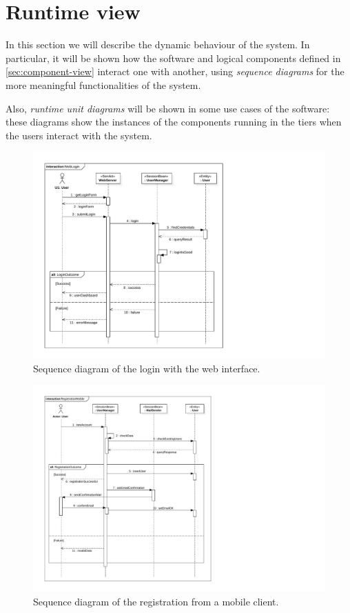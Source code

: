 \section{Runtime view}
\label{sec:runtime-view}

In this section we will describe the dynamic behaviour of the system.
In particular, it will be shown how the software and logical components defined in \autoref{sec:component-view} interact one with another, using \emph{sequence diagrams} for the more meaningful functionalities of the system.

Also, \emph{runtime unit diagrams} will be shown in some use cases of the software: these diagrams show the instances of the components running in the tiers when the users interact with the system.

\begin{figure}[h]
    \centering
    \includegraphics[width=\textwidth]{diagrams/sequence_weblogin}
    \caption{Sequence diagram of the login with the web interface.}
    \label{fig:sequence-weblogin}
\end{figure}

\begin{figure}[h]
    \centering
    \includegraphics[width=\textwidth]{diagrams/sequence_registrationmobile}
    \caption{Sequence diagram of the registration from a mobile client.}
    \label{fig:sequence-registrationmobile}
\end{figure}

